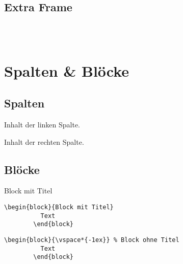   \subsection{Extra Frame}
  \begin{frame}[fragile]{\subsecname}

    \begin{lstlisting}[gobble=6]
      % Option [fragile] ist erforderlich!

      
    \end{lstlisting}

  \end{frame}

\section{Spalten \& Blöcke}

  \subsection{Spalten}
  \begin{frame}{\subsecname}

    \begin{minipage}[t]{0.5\textwidth}
      \par\medskip
      Inhalt der linken Spalte.
    \end{minipage}%
    \begin{minipage}[t]{0.5\textwidth}
      \par\medskip
      Inhalt der rechten Spalte.
    \end{minipage}

  \end{frame}

  \subsection{Blöcke}
  \begin{frame}[fragile]{\subsecname}

    \begin{block}{Block mit Titel}
      \begin{lstlisting}[gobble=8]
        \begin{block}{Block mit Titel}
          Text
        \end{block}
      \end{lstlisting}
    \end{block}

    \begin{block}{\vspace*{-1ex}}
      \begin{lstlisting}[gobble=8]
        \begin{block}{\vspace*{-1ex}} % Block ohne Titel
          Text
        \end{block}
      \end{lstlisting}
    \end{block}

  \end{frame}

